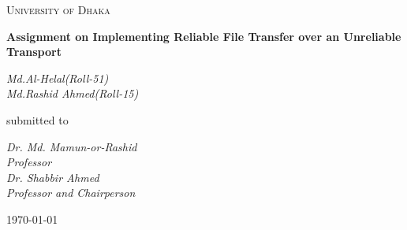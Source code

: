 \documentclass[12pt,a4paper]{report}
\begin{document}
\begin{titlepage}
\centering
{\scshape\LARGE University of Dhaka \par}
\vspace{1.5cm}
{\huge\bfseries Assignment on Implementing Reliable File Transfer over an Unreliable Transport\par}
\vspace{2cm}
{\Large\itshape Md.Al-Helal(Roll-51)\\Md.Rashid Ahmed(Roll-15)\par}
\vfill
submitted to\par
{\itshape Dr. Md. Mamun-or-Rashid \\ Professor \\Dr. Shabbir Ahmed \\Professor and Chairperson}
\vfill
{\large \today\par}
\end{titlepage}
\end{document}
